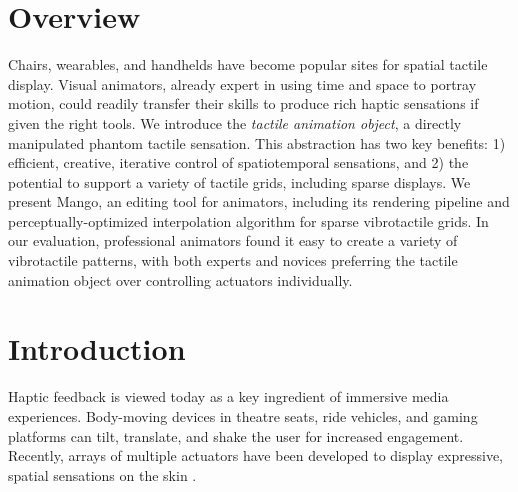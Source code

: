 


\section{Overview}
Chairs, wearables, and handhelds have become popular sites for spatial tactile display.
Visual animators, 
already expert in using time and space to portray motion, could readily transfer their skills to produce rich haptic sensations if given the right tools.
We introduce the \emph{tactile animation object}, a directly manipulated phantom tactile sensation.
This abstraction has two key benefits: 1) efficient, creative, iterative control of spatiotemporal sensations,
and 2) the potential to support a variety of tactile grids, including sparse displays.
We present Mango, an editing tool for animators, including its rendering pipeline and perceptually-optimized interpolation algorithm for sparse vibrotactile grids.
In our evaluation,
professional animators found it easy to create a variety of
vibrotactile patterns, with both experts and novices preferring the tactile animation object over
controlling actuators individually.

  
%
%
\section{Introduction}

Haptic feedback is
viewed today %
as a key ingredient of immersive media experiences.
Body-moving devices in theatre seats, ride vehicles, and gaming platforms can tilt, translate, and shake the user for increased engagement. 
Recently, arrays of multiple actuators have been developed to display expressive, spatial sensations on the skin 
\cite{Israr2011,Danieau2012a,Sodhi2013,Kim2009,Wilson2014}. 

